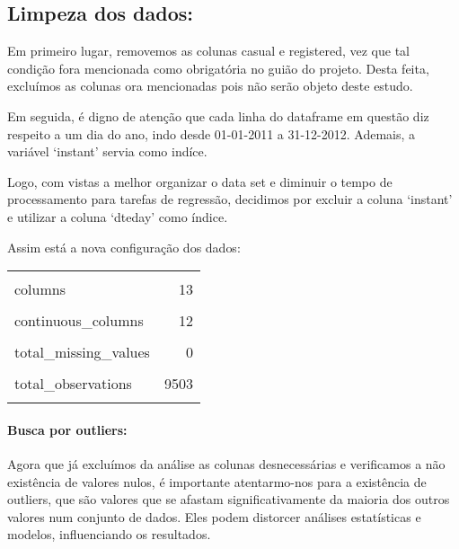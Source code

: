 \documentclass[
  letterpaper,
  DIV=11,
  numbers=noendperiod]{scrartcl}
\let\oldparagraph\paragraph
\renewcommand{\paragraph}[1]{\oldparagraph{#1}\mbox{}}
\begin{document}
\subsection{Limpeza dos dados:}\label{limpeza-dos-dados}

Em primeiro lugar, removemos as colunas casual e registered, vez que tal
condição fora mencionada como obrigatória no guião do projeto. Desta
feita, excluímos as colunas ora mencionadas pois não serão objeto deste
estudo.

Em seguida, é digno de atenção que cada linha do dataframe em questão
diz respeito a um dia do ano, indo desde 01-01-2011 a 31-12-2012.
Ademais, a variável `instant' servia como indíce.

Logo, com vistas a melhor organizar o data set e diminuir o tempo de
processamento para tarefas de regressão, decidimos por excluir a coluna
`instant' e utilizar a coluna `dteday' como índice.

Assim está a nova configuração dos dados:

\begin{table}[!h]
\centering\begingroup\fontsize{10}{12}\selectfont

\begin{tabular}{lr}
\toprule
\cellcolor{gray!15}{rows} & \cellcolor{gray!15}{731}\\
columns & 13\\
\cellcolor{gray!15}{discrete\_columns} & \cellcolor{gray!15}{1}\\
continuous\_columns & 12\\
\cellcolor{gray!15}{all\_missing\_columns} & \cellcolor{gray!15}{0}\\
\addlinespace
total\_missing\_values & 0\\
\cellcolor{gray!15}{complete\_rows} & \cellcolor{gray!15}{731}\\
total\_observations & 9503\\
\cellcolor{gray!15}{memory\_usage} & \cellcolor{gray!15}{102928}\\
\bottomrule
\end{tabular}
\endgroup{}
\end{table}

\paragraph{Busca por outliers:}\label{busca-por-outliers}

Agora que já excluímos da análise as colunas desnecessárias e
verificamos a não existência de valores nulos, é importante
atentarmo-nos para a existência de outliers, que são valores que se
afastam significativamente da maioria dos outros valores num conjunto de
dados. Eles podem distorcer análises estatísticas e modelos,
influenciando os resultados.
\end{document}
